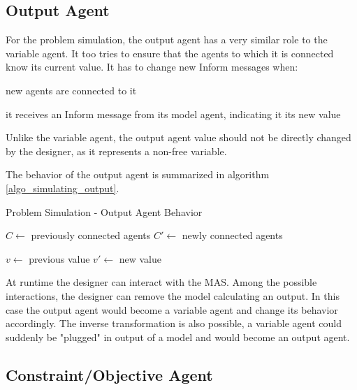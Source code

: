 \subsection{Output Agent}

For the problem simulation, the output agent has a very similar role to the variable agent. It too tries to ensure that the agents to which it is connected know its current value. It has to change new Inform messages when:
\begin{compactitem}
\item new agents are connected to it
\item it receives an Inform message from its model agent, indicating it its new value
\end{compactitem}

Unlike the variable agent, the output agent value should not be directly changed by the designer, as it represents a non-free variable.

The behavior of the output agent is summarized in algorithm \ref{algo_simulating_output}.

\begin{algorithm}
\caption{Problem Simulation - Output Agent Behavior}
\label{algo_simulating_output}
\begin{algorithmic}
	$C \leftarrow$ previously connected agents\;
	$C'\leftarrow$  newly connected agents\;
		
	$v \leftarrow$ previous value\;
	$v'\leftarrow$ new value\;
	
	
	
\end{algorithmic}
\end{algorithm}

At runtime the designer can interact with the MAS. Among the possible interactions, the designer can remove the model calculating an output. In this case the output agent would become a variable agent and change its behavior accordingly. The inverse transformation is also possible, a variable agent could suddenly be "plugged" in output of a model and would become an output agent.

\subsection{Constraint/Objective Agent}

